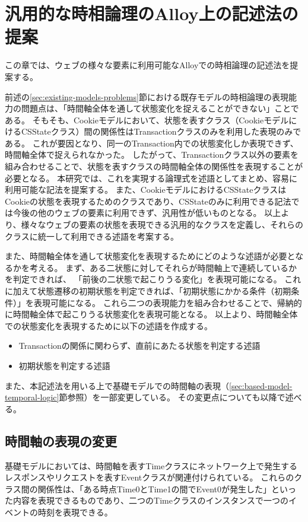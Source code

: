 \documentclass[12pt,a4paper]{jbook}
\begin{document}
\newpage

\chapter{汎用的な時相論理のAlloy上の記述法の提案}
\label{sec:ProposedModel-TemporalLogic}
この章では、ウェブの様々な要素に利用可能なAlloyでの時相論理の記述法を提案する。

前述の\ref{sec:existing-models-problems}節における既存モデルの時相論理の表現能力の問題点は、「時間軸全体を通して状態変化を捉えることができない」ことである。
\color{red}
そもそも、Cookieモデルにおいて、状態を表すクラス（CookieモデルにけるCSStateクラス）間の関係性はTransactionクラスのみを利用した表現のみである。
これが要因となり、同一のTransaction内での状態変化しか表現できず、時間軸全体で捉えられなかった。
したがって、Transactionクラス以外の要素を組み合わせることで、状態を表すクラスの時間軸全体の関係性を表現することが必要となる。
本研究では、これを実現する論理式を述語としてまとめ、容易に利用可能な記法を提案する。
また、CookieモデルにおけるCSStateクラスはCookieの状態を表現するためのクラスであり、CSStateのみに利用できる記法では今後の他のウェブの要素に利用できず、汎用性が低いものとなる。
以上より、様々なウェブの要素の状態を表現できる汎用的なクラスを定義し、それらのクラスに統一して利用できる述語を考案する。
\color{black}

また、時間軸全体を通して状態変化を表現するためにどのような述語が必要となるかを考える。
\color{red}
まず、ある二状態に対してそれらが時間軸上で連続しているかを判定できれば、
「前後の二状態で起こりうる変化」を表現可能になる。
これに加えて状態遷移の初期状態を判定できれば、「初期状態にかかる条件（初期条件）」を表現可能になる。
これら二つの表現能力を組み合わせることで、帰納的に時間軸全体で起こりうる状態変化を表現可能となる。
以上より、時間軸全体での状態変化を表現するために以下の述語を作成する。
\color{black}
\begin{itemize}
\item Transactionの関係に関わらず、直前にあたる状態を判定する述語
\item 初期状態を判定する述語
\end{itemize}

また、本記述法を用いる上で基礎モデルでの時間軸の表現（\ref{sec:based-model-temporal-logic}節参照）を一部変更している。
その変更点についても以降で述べる。

\section{時間軸の表現の変更}
基礎モデル\cite{based-model}においては、時間軸を表すTimeクラスにネットワーク上で発生するレスポンスやリクエストを表すEventクラスが関連付けられている。
これらのクラス間の関係性は、「ある時点Time0とTime1の間でEvent0が発生した」といった内容を表現できるものであり、二つのTimeクラスのインスタンスで一つのイベントの時刻を表現できる。
\end{document}
